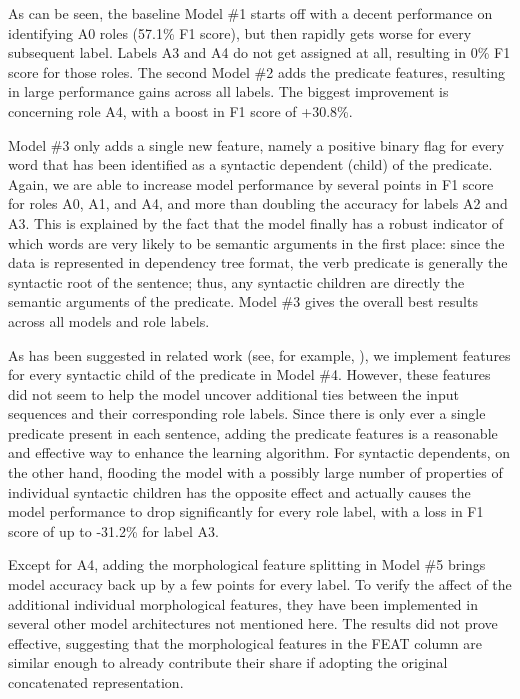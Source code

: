 \documentclass[a4paper,twoside,12pt]{article}
\begin{document}
As can be seen, the baseline Model \#1 starts off with a decent performance on identifying A0 roles (57.1\% F1 score), but then rapidly gets worse for every subsequent label. Labels A3 and A4 do not get assigned at all, resulting in 0\% F1 score for those roles. The second Model \#2 adds the predicate features, resulting in large performance gains across all labels. The biggest improvement is concerning role A4, with a boost in F1 score of +30.8\%.

Model \#3 only adds a single new feature, namely a positive binary flag for every word that has been identified as a syntactic dependent (child) of the predicate. Again, we are able to increase model performance by several points in F1 score for roles A0, A1, and A4, and more than doubling the accuracy for labels A2 and A3. This is explained by the fact that the model finally has a robust indicator of which words are very likely to be semantic arguments in the first place: since the data is represented in dependency tree format, the verb predicate is generally the syntactic root of the sentence; thus, any syntactic children are directly the semantic arguments of the predicate. Model \#3 gives the overall best results across all models and role labels.

\pagebreak
As has been suggested in related work (see, for example, \cite{lund}), we implement features for every syntactic child of the predicate in Model \#4. However, these features did not seem to help the model uncover additional ties between the input sequences and their corresponding role labels. Since there is only ever a single predicate present in each sentence, adding the predicate features is a reasonable and effective way to enhance the learning algorithm. For syntactic dependents, on the other hand, flooding the model with a possibly large number of properties of individual syntactic children has the opposite effect and actually causes the model performance to drop significantly for every role label, with a loss in F1 score of up to -31.2\% for label A3.

Except for A4, adding the morphological feature splitting in Model \#5 brings model accuracy back up by a few points for every label. To verify the affect of the additional individual morphological features, they have been implemented in several other model architectures not mentioned here. The results did not prove effective, suggesting that the morphological features in the FEAT column are similar enough to already contribute their share if adopting the original concatenated representation.
\end{document}
